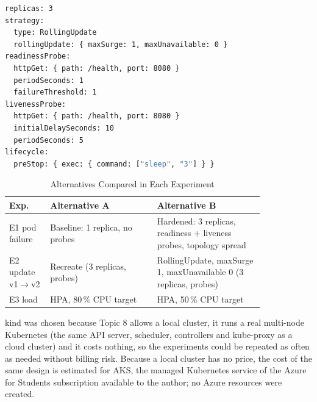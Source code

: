 \documentclass[conference,a4paper]{IEEEtran}
\begin{document}
\begin{lstlisting}[language=bash, float=tb, caption={Excerpt of k8s/api-hardened.yaml}, label={lst:hardened}]
replicas: 3
strategy:
  type: RollingUpdate
  rollingUpdate: { maxSurge: 1, maxUnavailable: 0 }
readinessProbe:
  httpGet: { path: /health, port: 8080 }
  periodSeconds: 1
  failureThreshold: 1
livenessProbe:
  httpGet: { path: /health, port: 8080 }
  initialDelaySeconds: 10
  periodSeconds: 5
lifecycle:
  preStop: { exec: { command: ["sleep", "3"] } }
\end{lstlisting}

\begin{table}[htbp]
	\caption{Alternatives Compared in Each Experiment}
	\label{tab:alternatives}
	\centering
	\footnotesize
	\begin{tabular}{|>{\raggedright\arraybackslash}p{0.13\linewidth}|>{\raggedright\arraybackslash}p{0.35\linewidth}|>{\raggedright\arraybackslash}p{0.35\linewidth}|}
		\hline
		\textbf{Exp.} & \textbf{Alternative A} & \textbf{Alternative B} \\
		\hline
		E1 pod failure & Baseline: 1 replica, no probes & Hardened: 3 replicas, readiness + liveness probes, topology spread \\
		\hline
		E2 update v1$\rightarrow$v2 & Recreate (3 replicas, probes) & RollingUpdate, maxSurge 1, maxUnavailable 0 (3 replicas, probes) \\
		\hline
		E3 load & HPA, 80\,\% CPU target & HPA, 50\,\% CPU target \\
		\hline
	\end{tabular}
\end{table}

kind was chosen because Topic 8 allows a local cluster, it runs a real multi-node Kubernetes (the same API server, scheduler, controllers and kube-proxy as a cloud cluster) and it costs nothing, so the experiments could be repeated as often as needed without billing risk. Because a local cluster has no price, the cost of the same design is estimated for AKS, the managed Kubernetes service of the Azure for Students subscription available to the author; no Azure resources were created.
\end{document}
